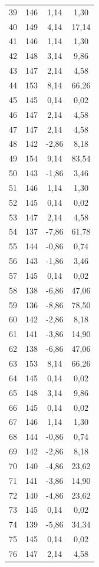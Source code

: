 \documentclass[10pt]{article}
\begin{document}
\begin{xltabular}{\textwidth}{|c|c|c|c|}
39  & 146 & 1,14  & 1,30  \\
40  & 149 & 4,14  & 17,14 \\
41  & 146 & 1,14  & 1,30  \\
42  & 148 & 3,14  & 9,86  \\
43  & 147 & 2,14  & 4,58  \\
44  & 153 & 8,14  & 66,26 \\
45  & 145 & 0,14  & 0,02  \\
46  & 147 & 2,14  & 4,58  \\
47  & 147 & 2,14  & 4,58  \\
48  & 142 & -2,86 & 8,18  \\
49  & 154 & 9,14  & 83,54 \\
50  & 143 & -1,86 & 3,46  \\
51  & 146 & 1,14  & 1,30  \\
52  & 145 & 0,14  & 0,02  \\
53  & 147 & 2,14  & 4,58  \\
54  & 137 & -7,86 & 61,78 \\
55  & 144 & -0,86 & 0,74  \\
56  & 143 & -1,86 & 3,46  \\
57  & 145 & 0,14  & 0,02  \\
58  & 138 & -6,86 & 47,06 \\
59  & 136 & -8,86 & 78,50 \\
60  & 142 & -2,86 & 8,18  \\
61  & 141 & -3,86 & 14,90 \\
62  & 138 & -6,86 & 47,06 \\
63  & 153 & 8,14  & 66,26 \\
64  & 145 & 0,14  & 0,02  \\
65  & 148 & 3,14  & 9,86  \\
66  & 145 & 0,14  & 0,02  \\
67  & 146 & 1,14  & 1,30  \\
68  & 144 & -0,86 & 0,74  \\
69  & 142 & -2,86 & 8,18  \\
70  & 140 & -4,86 & 23,62 \\
71  & 141 & -3,86 & 14,90 \\
72  & 140 & -4,86 & 23,62 \\
73  & 145 & 0,14  & 0,02  \\
74  & 139 & -5,86 & 34,34 \\
75  & 145 & 0,14  & 0,02  \\
76  & 147 & 2,14  & 4,58  \\

\end{xltabular}
\end{document}

